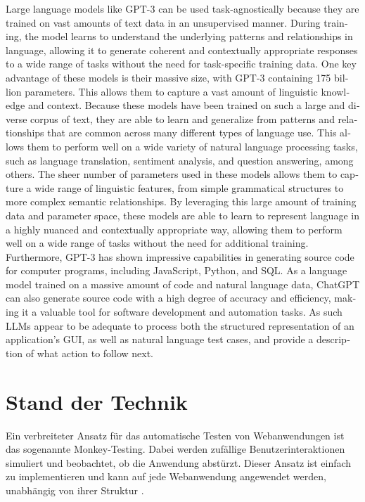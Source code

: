 \begin{otherlanguage}{english}
Large language models like GPT-3 can be used task-agnostically because they are trained on vast amounts of text data in an unsupervised manner. During training, the model learns to understand the underlying patterns and relationships in language, allowing it to generate coherent and contextually appropriate responses to a wide range of tasks without the need for task-specific training data.
One key advantage of these models is their massive size, with GPT-3 containing 175 billion parameters.
This allows them to capture a vast amount of linguistic knowledge and context.
Because these models have been trained on such a large and diverse corpus of text, they are able to learn and generalize from patterns and relationships that are common across many different types of language use. This allows them to perform well on a wide variety of natural language processing tasks, such as language translation, sentiment analysis, and question answering, among others.
The sheer number of parameters used in these models allows them to capture a wide range of linguistic features, from simple grammatical structures to more complex semantic relationships. By leveraging this large amount of training data and parameter space, these models are able to learn to represent language in a highly nuanced and contextually appropriate way, allowing them to perform well on a wide range of tasks without the need for additional training.
Furthermore, GPT-3 has shown impressive capabilities in generating source code for computer programs, including JavaScript, Python, and SQL. As a language model trained on a massive amount of code and natural language data, ChatGPT can also generate source code with a high degree of accuracy and efficiency, making it a valuable tool for software development and automation tasks.
As such LLMs appear to be adequate to process both the structured representation of an application’s GUI, as well as natural language test cases, and provide a description of what action to follow next.
\end{otherlanguage}
\fi

\chapter{Stand der Technik}
\label{ch:RelatedWork}

Ein verbreiteter Ansatz für das automatische Testen von Webanwendungen ist das sogenannte Monkey-Testing.
Dabei werden zufällige Benutzerinteraktionen simuliert und beobachtet, ob die Anwendung abstürzt.
Dieser Ansatz ist einfach zu implementieren und kann auf jede Webanwendung angewendet werden, unabhängig von ihrer Struktur \cite{monkey_testing}.

